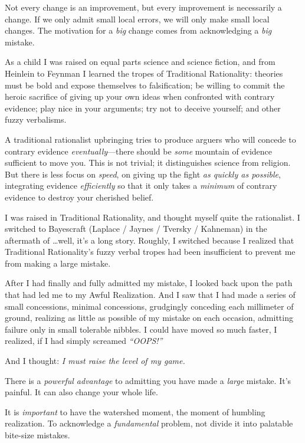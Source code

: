 {
 Not every change is an improvement, but every improvement is
necessarily a change. If we only admit small local errors, we will only
make small local changes. The motivation for a \textit{big} change
comes from acknowledging a \textit{big} mistake.}

{
 As a child I was raised on equal parts science and science
fiction, and from Heinlein to Feynman I learned the tropes of
Traditional Rationality: theories must be bold and expose themselves to
falsification; be willing to commit the heroic sacrifice of giving up
your own ideas when confronted with contrary evidence; play nice in
your arguments; try not to deceive yourself; and other fuzzy
verbalisms.}

{
 A traditional rationalist upbringing tries to produce arguers who
will concede to contrary evidence \textit{eventually}{}---there should
be \textit{some} mountain of evidence sufficient to move you. This is
not trivial; it distinguishes science from religion. But there is less
focus on \textit{speed}, on giving up the fight \textit{as quickly as
possible}, integrating evidence \textit{efficiently} so that it only
takes a \textit{minimum} of contrary evidence to destroy your cherished
belief.}

{
 I was raised in Traditional Rationality, and thought myself quite
the rationalist. I switched to Bayescraft (Laplace / Jaynes / Tversky /
Kahneman) in the aftermath of \ldots well, it's a long
story. Roughly, I switched because I realized that Traditional
Rationality's fuzzy verbal tropes had been insufficient
to prevent me from making a large mistake.}

{
 After I had finally and fully admitted my mistake, I looked back
upon the path that had led me to my Awful Realization. And I saw that I
had made a series of small concessions, minimal concessions, grudgingly
conceding each millimeter of ground, realizing as little as possible of
my mistake on each occasion, admitting failure only in small tolerable
nibbles. I could have moved so much faster, I realized, if I had simply
screamed \textit{``OOPS!''}}

{
 And I thought: \textit{I must raise the level of my game.}}

{
 There is a \textit{powerful advantage} to admitting you have made
a \textit{large} mistake. It's painful. It can also
change your whole life.}

{
 It is \textit{important} to have the watershed moment, the moment
of humbling realization. To acknowledge a \textit{fundamental} problem,
not divide it into palatable bite-size mistakes.}

